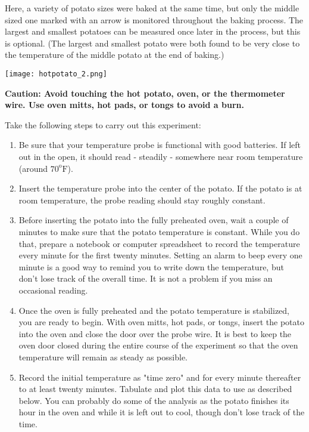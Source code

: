 \documentclass{ximera}
\begin{document}
Here, a variety of potato sizes were baked at the same time, but only the middle sized one marked with an arrow is monitored throughout the baking process.  The largest and smallest potatoes can be measured once later in the process, but this is optional.  (The largest and smallest potato were both found to be very close to the temperature of the middle potato at the end of baking.)
 
\begin{image}
\texttt{[image: hotpotato\_2.png]}
\end{image}
 
\textbf{Caution: Avoid touching the hot potato, oven, or the thermometer wire.  Use oven mitts, hot pads, or tongs to avoid a burn.}
 
Take the following steps to carry out this experiment:
\begin{enumerate}
\item Be sure that your temperature probe is functional with good batteries.  If left out in the open, it should read - steadily - somewhere near room temperature (around $70^{\text{o}}\text{F}$).
\item Insert the temperature probe into the center of the potato.  If the potato is at room temperature, the probe reading should stay roughly constant. 
\item Before inserting the potato into the fully preheated oven, wait a couple of minutes to make sure that the potato temperature is constant.  While you do that, prepare a notebook or computer spreadsheet to record the temperature every minute for the first twenty minutes.  Setting an alarm to beep every one minute is a good way to remind you to write down the temperature, but don't lose track of the overall time.  It is not a problem if you miss an occasional reading.
\item Once the oven is fully preheated and the potato temperature is stabilized, you are ready to begin.  With oven mitts, hot pads, or tongs, insert the potato into the oven and close the door over the probe wire.  It is best to keep the oven door closed during the entire course of the experiment so that the oven temperature will remain as steady as possible.
\item Record the initial temperature as "time zero" and for every minute thereafter to at least twenty minutes.  Tabulate and plot this data to use as described below.  You can probably do some of the analysis as the potato finishes its hour in the oven and while it is left out to cool, though don't lose track of the time.

\end{enumerate}
\end{document}
